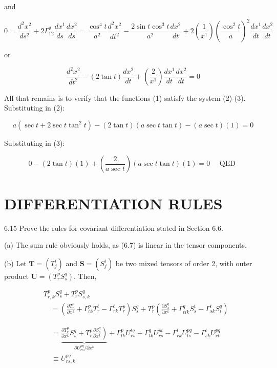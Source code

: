 \documentclass[10pt]{article}
\begin{document}
and

$$
0=\frac{d^{2} x^{2}}{d s^{2}}+2 \Gamma_{12}^{2} \frac{d x^{1}}{d s} \frac{d x^{2}}{d s}=\frac{\cos ^{4} t}{a^{2}} \frac{d^{2} x^{2}}{d t^{2}}-\frac{2 \sin t \cos ^{3} t}{a^{2}} \frac{d x^{2}}{d t}+2\left(\frac{1}{x^{1}}\right)\left(\frac{\cos ^{2} t}{a}\right)^{2} \frac{d x^{1}}{d t} \frac{d x^{2}}{d t}
$$

or


\begin{equation*}
\frac{d^{2} x^{2}}{d t^{2}}-(2 \tan t) \frac{d x^{2}}{d t}+\left(\frac{2}{x^{1}}\right) \frac{d x^{1}}{d t} \frac{d x^{2}}{d t}=0 \tag{3}
\end{equation*}


All that remains is to verify that the functions (1) satisfy the system (2)-(3). Substituting in (2):

$$
a\left(\sec t+2 \sec t \tan ^{2} t\right)-(2 \tan t)(a \sec t \tan t)-(a \sec t)(1)=0
$$

Substituting in (3):

$$
0-(2 \tan t)(1)+\left(\frac{2}{a \sec t}\right)(a \sec t \tan t)(1)=0 \quad \text { QED }
$$

\section*{DIFFERENTIATION RULES}
6.15 Prove the rules for covariant differentiation stated in Section 6.6.

(a) The sum rule obviously holds, as (6.7) is linear in the tensor components.

(b) Let $\mathbf{T}=\left(T_{j}^{i}\right)$ and $\mathbf{S}=\left(S_{j}^{i}\right)$ be two mixed tensors of order 2, with outer product $\mathbf{U}=\left(T_{r}^{p} S_{s}^{q}\right)$. Then,

$$
\begin{aligned}
& T_{r, k}^{p} S_{s}^{q}+T_{r}^{p} S_{s, k}^{q} \\
& \quad=\left(\frac{\partial T_{r}^{p}}{\partial x^{k}}+\Gamma_{t k}^{p} T_{r}^{t}-\Gamma_{r k}^{t} T_{r}^{p}\right) S_{s}^{q}+T_{r}^{p}\left(\frac{\partial S_{s}^{q}}{\partial x^{k}}+\Gamma_{t i k}^{q} S_{s}^{t}-\Gamma_{s k}^{t} S_{t}^{q}\right)
\end{aligned}
$$

$$
\begin{aligned}
& =\underbrace{\left.\frac{\partial T_{r}^{p}}{\partial x^{k}} S_{s}^{q}+T_{r}^{p} \frac{\partial S_{s}^{q}}{\partial x^{k}}\right)}_{\partial U_{r s}^{p q} / \partial x^{k}}+\Gamma_{t k}^{p} U_{r s}^{t q}+\Gamma_{t k}^{q} U_{r s}^{p t}-\Gamma_{r k}^{t} U_{t s}^{p q}-\Gamma_{s k}^{t} U_{r t}^{p q} \\
& \equiv U_{r s, k}^{p q}
\end{aligned}
$$
\end{document}
